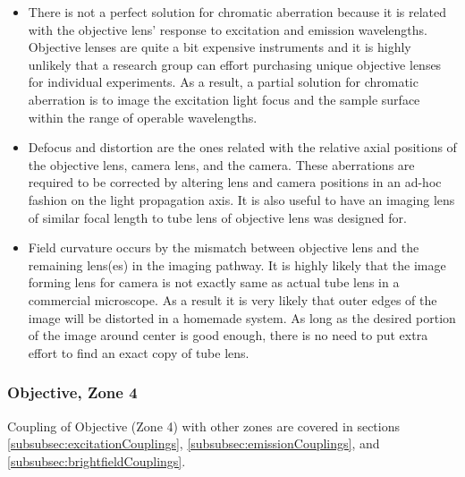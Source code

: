 \begin{itemize}
	\item There is not a perfect solution for chromatic aberration because it is related with 
	the objective lens' response to excitation and emission wavelengths. Objective lenses are 
	quite a bit expensive instruments and it is highly unlikely that a research group can
	effort purchasing unique objective lenses for individual experiments. As a result, a 
	partial solution for chromatic aberration is  to image the excitation light focus and
	the sample surface within the range of operable wavelengths.

	\item Defocus and distortion are the ones related with the relative axial positions of 
	the objective lens, camera lens, and the camera. These aberrations are required to be 
	corrected by altering lens and camera positions in an ad-hoc fashion on the light 
	propagation axis. It is also useful to have an imaging lens of similar focal length 
	to tube lens of objective lens was designed for.

	\item Field curvature occurs by the mismatch between objective lens and the remaining
	lens(es) in the imaging pathway. It is highly likely that the image forming lens for
	camera is not exactly same as actual tube lens in a commercial microscope. As a result
	it is very likely that outer edges of the image will be distorted in a homemade system.
	As long as the desired portion of the image around center is good enough, there is no
	need to put extra effort to find an exact copy of tube lens.
\end{itemize}

\subsubsection{Objective, Zone 4}
Coupling of Objective (Zone 4) with other zones are covered in sections \ref{subsubsec:excitationCouplings},
\ref{subsubsec:emissionCouplings}, and \ref{subsubsec:brightfieldCouplings}. 
